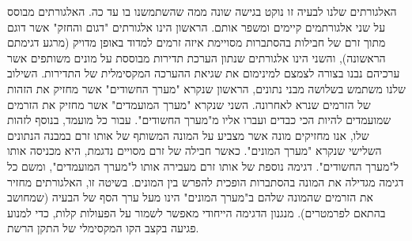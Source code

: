 {האלגורתים שלנו לבעיה זו נוקט בגישה שונה ממה שהשתמשנו בו עד כה. האלגורתים מבוסס על שני אלגורתמים קיימים ומשפר אותם. הראשון הינו אלגורתים "דגום והחזק" אשר דוגם מתוך זרם של חבילות בהסתברות מסויימת איזה זרמים למדוד באופן מדויק (מרגע דגימתם הראשונה), והשני הינו אלגורתים שנתון הערכת תדירות מבוססת על מונים משותפים אשר ערכיהם נבנו בצורה לצמצם למינימום את שגיאת ההערכה המקסימלית של התדירות. השילוב שלנו משתמש בשלושה מבני נתונים, הראשון שנקרא "מערך החשודים" אשר מחזיק את הזהות של הזרמים שנרא לאחרונה. השני שנקרא "מערך המועמדים" אשר מחזיק את הזרמים שמועמדים להיות הכי כבדים ועברו אליו מ"מערך החשודים". עבור כל מועמד, בנוסף לזהות שלו, אנו מחזיקים מונה אשר מצביע על המונה המשותף של אותו זרם במבנה הנתונים השלישי שנקרא "מערך המונים". כאשר חבילה של זרם מסויים נדגמת, היא מכניסה אותו ל"מערך החשודים". דגימה נוספת של אותו זרם מעבירה אותו ל"מערך המועמדים", ומשם כל דגימה מגדילה את המונה בהסתברות הופכית להפרש בין המונים. בשיטה זו, האלגורתים מחזיר את הזרמים שהמונה שלהם ב"מערך המונים" הינו מעל ערך הסף של הבעיה (שמחושב בהתאם לפרמטרים). מנגנון הדגימה הייחודי מאפשר לשמור על הפעולות קלות, כדי למנוע פגיעה בקצב הקו המקסימלי של התקן הרשת.
}
